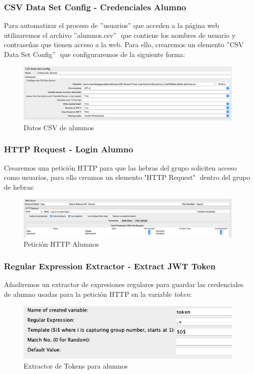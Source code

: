 \subsubsection{CSV Data Set Config - Credenciales Alumno}
Para automatizar el proceso de ''usuarios''$ $ que acceden a la página web utilizaremos el archivo ''alumnos.csv'' $ $ que contiene los nombres de usuario y contraseñas
que tienen acceso a la web. Para ello, crearemos un elemento ''CSV Data Set Config'' $ $ que configuraremos de la siguiente forma:
\begin{figure}[H]
    \centering
    \includegraphics[scale=0.33]{images/csv_alumnos.png}
    \caption{Datos CSV de alumnos}
    \label{fig:csv_alumnos}
\end{figure}

\subsubsection{HTTP Request - Login Alumno}
Crearemos una petición HTTP para que las hebras del grupo soliciten acceso como usuarios, para ello creamos un elemento "HTTP Request" $ $ dentro del grupo de hebras:
\begin{figure}[H]
    \centering
    \includegraphics[scale=0.33]{images/login_alumnos.png}
    \caption{Petición HTTP Alumnos}
    \label{fig:login_alumnos}
\end{figure}

\subsubsection{Regular Expression Extractor - Extract JWT Token}
Añadiremos un extractor de expresiones regulares para guardar las credenciales de alumno usadas para la petición HTTP en la variable \emph{token}:
\begin{figure}[H]
    \centering
    \includegraphics[scale=0.6]{images/token_alumnos.png}
    \caption{Extractor de Tokens para alumnos}
    \label{fig:token_alumnos}
\end{figure}

